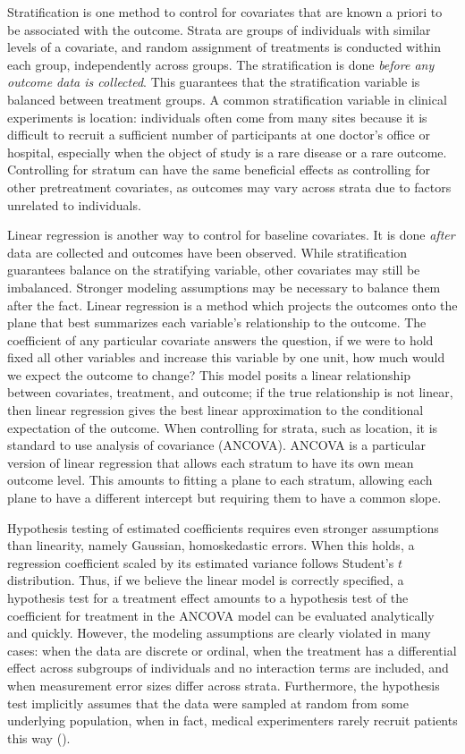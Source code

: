 \documentclass[11pt]{article}
\begin{document}
Stratification is one method to control for covariates that are known a priori to be associated with the outcome.
Strata are groups of individuals with similar levels of a covariate, and random assignment of treatments is conducted within each group, independently across groups.
The stratification is done \textit{before any outcome data is collected}.
This guarantees that the stratification variable is balanced between treatment groups.
A common stratification variable in clinical experiments is location:
individuals often come from many sites because it is difficult to recruit a sufficient number of participants at one doctor's office or hospital,
especially when the object of study is a rare disease or a rare outcome.
Controlling for stratum can have the same beneficial effects as controlling for other pretreatment covariates, 
as outcomes may vary across strata due to factors unrelated to individuals.

Linear regression is another way to control for baseline covariates.
It is done \textit{after} data are collected and outcomes have been observed.
While stratification guarantees balance on the stratifying variable, other covariates may still be imbalanced.
Stronger modeling assumptions may be necessary to balance them after the fact.
Linear regression is a method which projects the outcomes onto the plane that best summarizes each variable's relationship to the outcome.
The coefficient of any particular covariate answers the question, if we were to hold fixed all other variables and increase this variable by one unit, how much would we expect the outcome to change?
This model posits a linear relationship between covariates, treatment, and outcome; 
if the true relationship is not linear, then linear regression gives the best linear approximation to the conditional expectation of the outcome.
When controlling for strata, such as location, it is standard to use analysis of covariance (ANCOVA).
ANCOVA is a particular version of linear regression that allows each stratum to have its own mean outcome level.
This amounts to fitting a plane to each stratum, allowing each plane to have a different intercept but requiring them to have a common slope.

Hypothesis testing of estimated coefficients requires even stronger assumptions than linearity, namely Gaussian, homoskedastic errors.
When this holds, a regression coefficient scaled by its estimated variance follows Student's $t$ distribution.
Thus, if we believe the linear model is correctly specified, a hypothesis test for a treatment effect amounts to a hypothesis test of the coefficient for treatment in the ANCOVA model can be evaluated analytically and quickly.
However, the modeling assumptions are clearly violated in many cases:
when the data are discrete or ordinal, 
when the treatment has a differential effect across subgroups of individuals and no interaction terms are included, 
and when measurement error sizes differ across strata.
Furthermore, the hypothesis test implicitly assumes that the data were sampled at random from some underlying population, when in fact,
medical experimenters rarely recruit patients this way (\cite{ludbrook_why_1998}).
\end{document}
